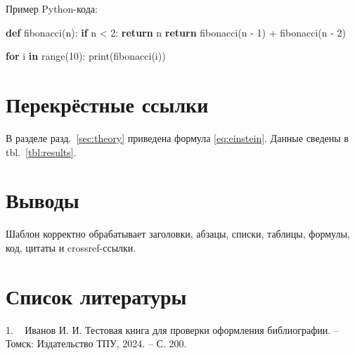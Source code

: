 \documentclass[a4paper,14pt]{extarticle}
\newenvironment{Shaded}{}{}
\newcommand{\BuiltInTok}[1]{\textcolor[rgb]{0.00,0.50,0.00}{#1}}
\newcommand{\ControlFlowTok}[1]{\textcolor[rgb]{0.00,0.44,0.13}{\textbf{#1}}}
\newcommand{\DecValTok}[1]{\textcolor[rgb]{0.25,0.63,0.44}{#1}}
\newcommand{\KeywordTok}[1]{\textcolor[rgb]{0.00,0.44,0.13}{\textbf{#1}}}
\newcommand{\NormalTok}[1]{#1}
\newcommand{\OperatorTok}[1]{\textcolor[rgb]{0.40,0.40,0.40}{#1}}
\renewenvironment{Shaded}{\begin{framed}}{\end{framed}}
\newenvironment{Shaded}{\begin{framed}}{\end{framed}}
\newcommand{\citeproctext}[1]{#1}
\newcommand{\CSLLeftMargin}[1]{#1~}
\newcommand{\CSLRightInline}[1]{#1}
\newenvironment{CSLReferences}[2]
  {\begin{description}[font=\normalfont, style=multiline, leftmargin=0pt]}
  {\end{description}}
\renewcommand{\bibitem}[2][]{%
  \item[]%
  \phantomsection\hypertarget{#2}{}%
  \ignorespaces%
}
\begin{document}
Пример Python-кода:

\begin{Shaded}
\begin{Highlighting}[]
\KeywordTok{def}\NormalTok{ fibonacci(n):}
    \ControlFlowTok{if}\NormalTok{ n }\OperatorTok{\textless{}} \DecValTok{2}\NormalTok{:}
        \ControlFlowTok{return}\NormalTok{ n}
    \ControlFlowTok{return}\NormalTok{ fibonacci(n }\OperatorTok{{-}} \DecValTok{1}\NormalTok{) }\OperatorTok{+}\NormalTok{ fibonacci(n }\OperatorTok{{-}} \DecValTok{2}\NormalTok{)}

\ControlFlowTok{for}\NormalTok{ i }\KeywordTok{in} \BuiltInTok{range}\NormalTok{(}\DecValTok{10}\NormalTok{):}
    \BuiltInTok{print}\NormalTok{(fibonacci(i))}
\end{Highlighting}
\end{Shaded}

\clearpage

\section{Перекрёстные
ссылки}\label{ux43fux435ux440ux435ux43aux440ux451ux441ux442ux43dux44bux435-ux441ux441ux44bux43bux43aux438}

В разделе разд.~\ref{sec:theory} приведена формула \eqref{eq:einstein}.
Данные сведены в tbl.~\ref{tbl:results}.

\clearpage

\section*{Выводы}\label{ux432ux44bux432ux43eux434ux44b}

Шаблон корректно обрабатывает заголовки, абзацы, списки, таблицы,
формулы, код, цитаты и crossref-ссылки.

\clearpage

\section*{Список
литературы}\label{ux441ux43fux438ux441ux43eux43a-ux43bux438ux442ux435ux440ux430ux442ux443ux440ux44b}

\protect{}\label{refs}
\begin{CSLReferences}{0}{0}
\bibitem[\citeproctext]{ref-test2024}
\CSLLeftMargin{1. }%
\CSLRightInline{Иванов И. И. Тестовая книга для проверки оформления
библиографии. -- Томск: Издательство ТПУ, 2024. -- С. 200.}

\end{CSLReferences}
\end{document}
